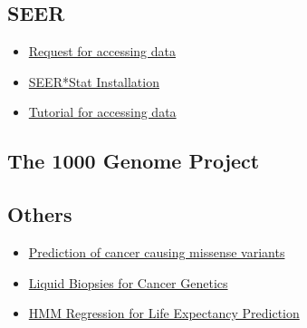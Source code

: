 \documentclass[15pt]{article}
\begin{document}
\subsection{SEER}
\begin{itemize}
\item \href{https://seer.cancer.gov/seertrack/data/request/}{Request for accessing data}
\item \href{https://seer.cancer.gov/seerstat/software/}{SEER*Stat Installation}
\item \href{https://seer.cancer.gov/seerstat/tutorials/case1a/webprint/}{Tutorial for accessing data}
\end{itemize}
\subsection{The 1000 Genome Project}
\subsection{Others}
\begin{itemize}
\item \href{https://www.ncbi.nlm.nih.gov/pubmed/21763417}{Prediction of cancer causing missense variants}
\item \href{https://www.nature.com/articles/nrclinonc.2013.110.pdf}{Liquid Biopsies for Cancer Genetics}
\item \href{http://citeseerx.ist.psu.edu/viewdoc/download;jsessionid=379A5ECA015A0475240A921B9FF1A0AD?doi=10.1.1.78.4479&rep=rep1&type=pdf}{HMM Regression for Life Expectancy Prediction }
\end{itemize}
\end{document}
